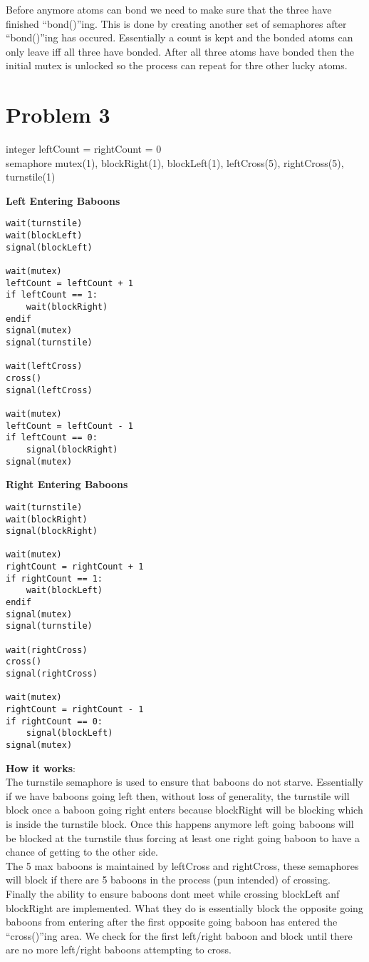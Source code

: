 \documentclass[]{article}
\begin{document}
Before anymore atoms can bond we need to make sure that the three have finished "`bond()"'ing. This is
done by creating another set of semaphores after "`bond()"'ing has occured. Essentially a count is kept
and the bonded atoms can only leave iff all three have bonded. After all three atoms have bonded then
the initial mutex is unlocked so the process can repeat for thre other lucky atoms.
\newpage

\section*{Problem 3}
integer leftCount = rightCount = 0 \\
semaphore mutex(1), blockRight(1), blockLeft(1), leftCross(5), rightCross(5), turnstile(1)
\begin{multicols}{2}
\textbf{Left Entering Baboons}
\begin{verbatim}
wait(turnstile)
wait(blockLeft)
signal(blockLeft)

wait(mutex)
leftCount = leftCount + 1
if leftCount == 1:
    wait(blockRight)
endif
signal(mutex)
signal(turnstile)

wait(leftCross)
cross()
signal(leftCross)

wait(mutex)
leftCount = leftCount - 1
if leftCount == 0:
    signal(blockRight)
signal(mutex)
\end{verbatim}

\textbf{Right Entering Baboons}
\begin{verbatim}
wait(turnstile)
wait(blockRight)
signal(blockRight)

wait(mutex)
rightCount = rightCount + 1
if rightCount == 1:
    wait(blockLeft)
endif
signal(mutex)
signal(turnstile)

wait(rightCross)
cross()
signal(rightCross)

wait(mutex)
rightCount = rightCount - 1
if rightCount == 0:
    signal(blockLeft)
signal(mutex)
\end{verbatim}
\end{multicols}

\textbf{How it works}: \\

The turnstile semaphore is used to ensure that baboons do not starve. Essentially if we have baboons 
going left then, without loss of generality, the turnstile will block once a baboon going right enters
because blockRight will be blocking which is inside the turnstile block. Once this happens anymore
left going baboons will be blocked at the turnstile thus forcing at least one right going baboon to
have a chance of getting to the other side. \\

The 5 max baboons is maintained by leftCross and rightCross, these semaphores will block if there are
5 baboons in the process (pun intended) of crossing. \\

Finally the ability to ensure baboons dont meet while crossing blockLeft anf blockRight are implemented.
What they do is essentially block the opposite going baboons from entering after the first opposite
going baboon has entered the "`cross()"'ing area. We check for the first left/right baboon and block until
there are no more left/right baboons attempting to cross.
\end{document}
